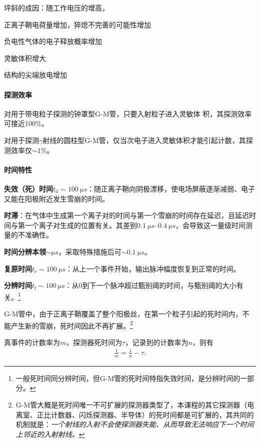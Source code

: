 坪斜的成因：随工作电压的增高，
\begin{compactenum}
	\item 正离子鞘电荷量增加，猝熄不完善的可能性增加
	\item 负电性气体的电子释放概率增加
	\item 灵敏体积增大
	\item 结构的尖端放电增加
\end{compactenum}
\paragraph{探测效率}
对用于带电粒子探测的钟罩型G-M管，只要入射粒子进入灵敏体
积，其探测效率可接近100\%。

对用于探测$\gamma$射线的圆柱型G-M管，仅当次电子进入灵敏体积才能引起计数，其探测效率仅$\sim 1\%$。
\paragraph{时间特性}
\begin{compactitem}
	\item \textbf{失效（死）时间}$t_\mathrm d\sim\SI{100}{\micro s}$：随正离子鞘向阴极漂移，使电场屏蔽逐渐减弱、电子又能在阳极附近发生雪崩的时间。
	\item \textbf{时滞}：在气体中生成第一个离子对的时间与第一个雪崩的时间存在延迟，且延迟时间与第一个离子对生成的位置有关。其差别$\SIrange{0.1}{0.4}{\micro s}$，会导致这一量级时间测量的不准确性。
	\item \textbf{时间分辨本领}$\sim\si{\micro s}$，采取特殊措施后可$\sim\SI{0.1}{\micro s}$。
	\item \textbf{复原时间}$t_\mathrm e\sim\SI{100}{\micro s}$：从上一个事件开始，输出脉冲幅度恢复到正常的时间。
	\item \textbf{分辨时间}$t_\mathrm f\sim\SI{100}{\micro s}$：从0到下一个脉冲超过甄别阈的时间，与甄别阈的大小有关。\footnote{一般死时间同分辨时间，但G-M管的死时间特指失效时间，是分辨时间的一部分。}
\end{compactitem}
G-M管中，由于正离子鞘覆盖了整个阳极丝，在第一个粒子引起的死时间内，不能产生新的雪崩，死时间因此不再扩展。\footnote{G-M管大概是死时间唯一不可扩展的探测器类型了，本课程的其它探测器（电离室、正比计数器、闪烁探测器、半导体）的死时间都是可扩展的，其共同的机制就是：\textit{一个射线的入射不会使探测器失能、从而导致无法响应下一个时间上邻近的入射射线。}}

真事件的计数率为$m$，探测器死时间为$\tau$，记录到的计数率为$n$，则有
\begin{align}
	\frac1m=\frac1n-\tau.
\end{align}

